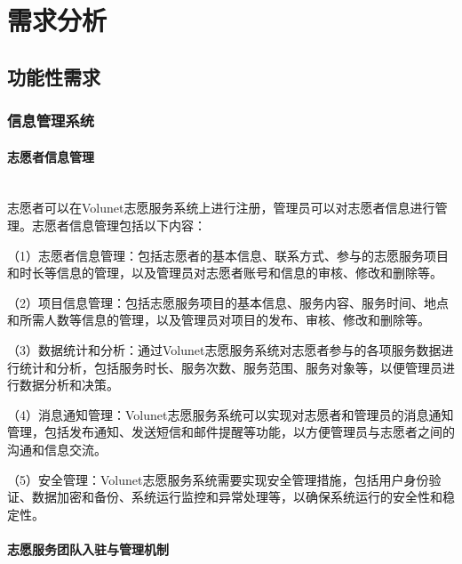 \section{需求分析}
\subsection{功能性需求}


\subsubsection{信息管理系统}

\paragraph{志愿者信息管理}~{}
\\

志愿者可以在Volunet志愿服务系统上进行注册，管理员可以对志愿者信息进行管理。志愿者信息管理包括以下内容：

（1）志愿者信息管理：包括志愿者的基本信息、联系方式、参与的志愿服务项目和时长等信息的管理，以及管理员对志愿者账号和信息的审核、修改和删除等。

（2）项目信息管理：包括志愿服务项目的基本信息、服务内容、服务时间、地点和所需人数等信息的管理，以及管理员对项目的发布、审核、修改和删除等。

（3）数据统计和分析：通过Volunet志愿服务系统对志愿者参与的各项服务数据进行统计和分析，包括服务时长、服务次数、服务范围、服务对象等，以便管理员进行数据分析和决策。

（4）消息通知管理：Volunet志愿服务系统可以实现对志愿者和管理员的消息通知管理，包括发布通知、发送短信和邮件提醒等功能，以方便管理员与志愿者之间的沟通和信息交流。

（5）安全管理：Volunet志愿服务系统需要实现安全管理措施，包括用户身份验证、数据加密和备份、系统运行监控和异常处理等，以确保系统运行的安全性和稳定性。

\paragraph{志愿服务团队入驻与管理机制}~{}
\\

